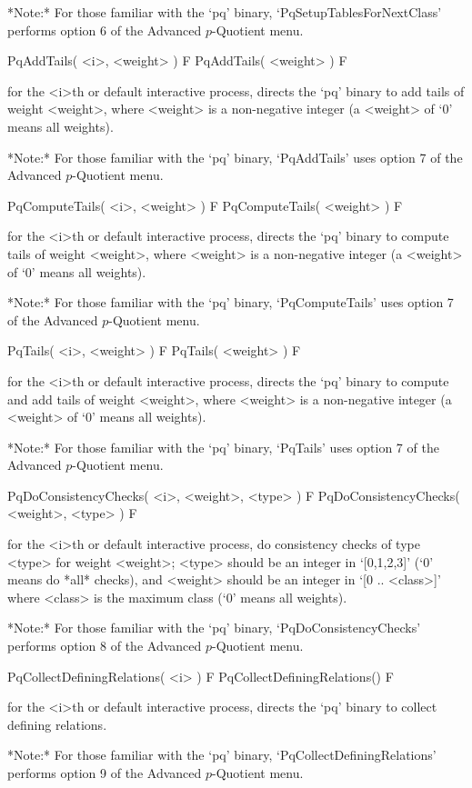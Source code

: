 *Note:* 
For those familiar  with  the  `pq'  binary,  `PqSetupTablesForNextClass'
performs option 6 of the Advanced $p$-Quotient menu.

\>PqAddTails( <i>, <weight> ) F
\>PqAddTails( <weight> ) F

for the <i>th or default interactive {\ANUPQ} process, directs  the  `pq'
binary to add tails of weight <weight>, where <weight> is a  non-negative
integer (a <weight> of `0' means all weights).

*Note:*
For those familiar with the `pq' binary, `PqAddTails' uses  option  7  of
the Advanced $p$-Quotient menu.

\>PqComputeTails( <i>, <weight> ) F
\>PqComputeTails( <weight> ) F

for the <i>th or default interactive {\ANUPQ} process, directs  the  `pq'
binary  to  compute  tails  of  weight  <weight>,  where  <weight>  is  a
non-negative integer (a <weight> of `0' means all weights).

*Note:*
For those familiar with the `pq' binary, `PqComputeTails' uses  option  7
of the Advanced $p$-Quotient menu.

\>PqTails( <i>, <weight> ) F
\>PqTails( <weight> ) F

for the <i>th or default interactive {\ANUPQ} process, directs  the  `pq'
binary to compute and add tails of weight <weight>, where <weight>  is  a
non-negative integer (a <weight> of `0' means all weights).

*Note:*
For those familiar with the `pq' binary, `PqTails' uses option 7  of  the
Advanced $p$-Quotient menu.

\>PqDoConsistencyChecks( <i>, <weight>, <type> ) F
\>PqDoConsistencyChecks( <weight>, <type> ) F

for the <i>th or default interactive  {\ANUPQ}  process,  do  consistency
checks of type <type> for weight <weight>; <type> should be an integer in
`[0,1,2,3]' (`0' means do  *all*  checks),  and  <weight>  should  be  an
integer in `[0 .. <class>]' where <class> is the maximum class (`0' means
all weights).

*Note:*
For those familiar with the `pq' binary, `PqDoConsistencyChecks' performs
option 8 of the Advanced $p$-Quotient menu.

\>PqCollectDefiningRelations( <i> ) F
\>PqCollectDefiningRelations() F

for the <i>th or default interactive {\ANUPQ} process, directs  the  `pq'
binary to collect defining relations.

*Note:*
For those familiar with  the  `pq'  binary,  `PqCollectDefiningRelations'
performs option 9 of the Advanced $p$-Quotient menu.

